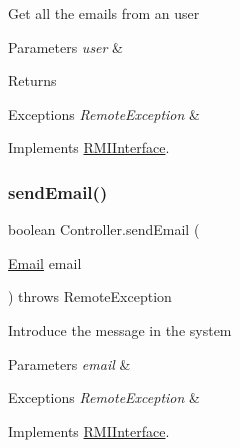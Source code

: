 Get all the emails from an user 
\begin{DoxyParams}{Parameters}
{\em user} & \\
\hline
\end{DoxyParams}
\begin{DoxyReturn}{Returns}

\begin{DoxyItemize}
\item 
\end{DoxyItemize}
\end{DoxyReturn}

\begin{DoxyExceptions}{Exceptions}
{\em Remote\+Exception} & \\
\hline
\end{DoxyExceptions}


Implements \hyperlink{interface_r_m_i_interface_ad326010c8c132dd3398a4443cf827601}{R\+M\+I\+Interface}.

\mbox{\label{class_controller_a5f9217d932e5189ac91b54bde4136964}} 
\subsubsection{\texorpdfstring{send\+Email()}{sendEmail()}}
{\footnotesize\ttfamily boolean Controller.\+send\+Email (\begin{DoxyParamCaption}\item[{\hyperlink{class_email}{Email}}]{email }\end{DoxyParamCaption}) throws Remote\+Exception}

Introduce the message in the system 
\begin{DoxyParams}{Parameters}
{\em email} & \\
\hline
\end{DoxyParams}

\begin{DoxyExceptions}{Exceptions}
{\em Remote\+Exception} & \\
\hline
\end{DoxyExceptions}


Implements \hyperlink{interface_r_m_i_interface_ad86e01382cdb0cb8a64710a7e9102524}{R\+M\+I\+Interface}.

\mbox{\label{class_controller_a8de8d716dde3d96111ef13686c91b10f}} 
